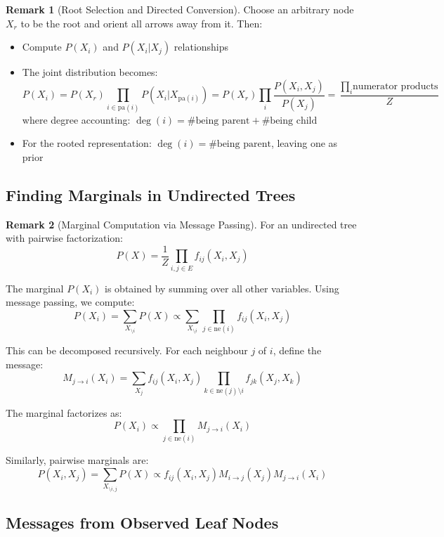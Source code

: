 \documentclass[12pt,a4paper]{article}
\theoremstyle{definition}
\newtheorem{remark}{Remark}[section]
\begin{document}
\begin{remark}[Root Selection and Directed Conversion]
Choose an arbitrary node $X_r$ to be the root and orient all arrows away from it. Then:

\begin{itemize}
    \item Compute $P(X_i)$ and $P(X_i | X_j)$ relationships
    \item The joint distribution becomes: 
    \[
    P(X_i) = P(X_r) \prod_{i \in \text{pa}(i)} P(X_i | X_{\text{pa}(i)}) = P(X_{r}) \prod_i \frac{P(X_i, X_j)}{P(X_j)} = \frac{\prod_i \text{numerator products}}{Z}
    \]
    where degree accounting: $\deg(i) = \text{\# being parent} + \text{\# being child}$
    \item For the rooted representation: $\deg(i) = \text{\# being parent}$, leaving one as prior
\end{itemize}
\end{remark}

\subsection{Finding Marginals in Undirected Trees}

\begin{remark}[Marginal Computation via Message Passing]
For an undirected tree with pairwise factorization:
\[
P(X) = \frac{1}{Z} \prod_{i,j \in E} f_{ij}(X_i, X_j)
\]

The marginal $P(X_i)$ is obtained by summing over all other variables. Using message passing, we compute:
\[
P(X_i) = \sum_{X_{\setminus i}} P(X) \propto \sum_{X_{\setminus i}} \prod_{j \in \text{ne}(i)} f_{ij}(X_i, X_j)
\]

This can be decomposed recursively. For each neighbour $j$ of $i$, define the message:
\[
M_{j \to i}(X_i) = \sum_{X_j} f_{ij}(X_i, X_j) \prod_{k \in \text{ne}(j) \setminus i} f_{jk}(X_j, X_k)
\]

The marginal factorizes as:
\[
P(X_i) \propto \prod_{j \in \text{ne}(i)} M_{j \to i}(X_i)
\]

Similarly, pairwise marginals are:
\[
P(X_i, X_j) = \sum_{X_{\setminus i,j}} P(X) \propto f_{ij}(X_i, X_j) M_{i \to j}(X_j) M_{j \to i}(X_i)
\]
\end{remark}

\subsection{Messages from Observed Leaf Nodes}
\end{document}

